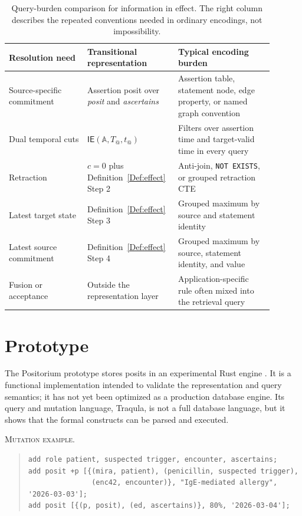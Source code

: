\documentclass[a4paper,fleqn]{cas-sc}
\newcommand{\ie}{\mathsf{IE}}
\theoremstyle{plain}
\theoremstyle{remark}
\begin{document}
\begin{table}[t]
\centering
\small
\begin{tabular}{Y{0.28\linewidth} Y{0.27\linewidth} Y{0.34\linewidth}}
\toprule
Resolution need & Transitional representation & Typical encoding burden \\
\midrule
Source-specific commitment & Assertion posit over \textit{posit} and \textit{ascertains} & Assertion table, statement node, edge property, or named graph convention \\
Dual temporal cuts & \(\ie(\mathbb{A},T_@,t_@)\) & Filters over assertion time and target-valid time in every query \\
Retraction & \(c=0\) plus Definition~\ref{Def:effect} Step 2 & Anti-join, \texttt{NOT EXISTS}, or grouped retraction CTE \\
Latest target state & Definition~\ref{Def:effect} Step 3 & Grouped maximum by source and statement identity \\
Latest source commitment & Definition~\ref{Def:effect} Step 4 & Grouped maximum by source, statement identity, and value \\
Fusion or acceptance & Outside the representation layer & Application-specific rule often mixed into the retrieval query \\
\bottomrule
\end{tabular}
\caption{Query-burden comparison for information in effect. The right column describes the repeated conventions needed in ordinary encodings, not impossibility.}
\label{Table:query-burden}
\end{table}

\section{Prototype}
\label{Sec:traqula}
The Positorium prototype \cite{Positorium} stores posits in an experimental Rust engine \cite{Matsakis}. It is a functional implementation intended to validate the representation and query semantics; it has not yet been optimized as a production database engine. Its query and mutation language, Traqula, is not a full database language, but it shows that the formal constructs can be parsed and executed.

\textsc{Mutation example.}
\begin{quote}
\small
\begin{verbatim}
add role patient, suspected trigger, encounter, ascertains;
add posit +p [{(mira, patient), (penicillin, suspected trigger),
               (enc42, encounter)}, "IgE-mediated allergy", '2026-03-03'];
add posit [{(p, posit), (ed, ascertains)}, 80%, '2026-03-04'];
\end{verbatim}
\end{quote}
\end{document}
